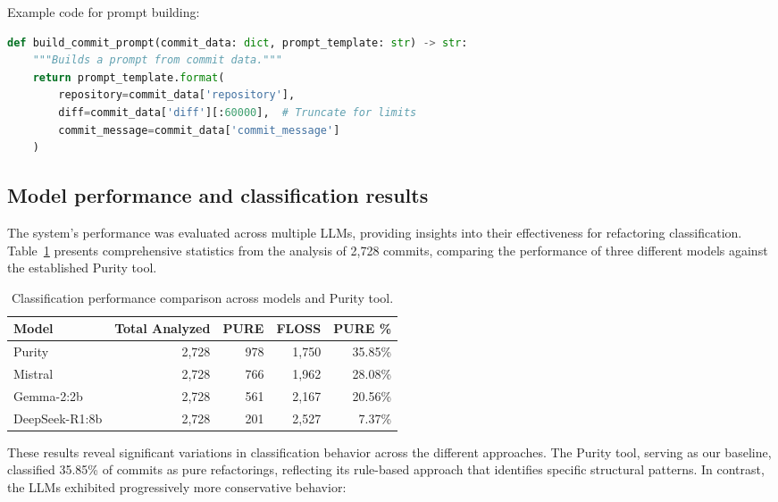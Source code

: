 



Example code for prompt building:

\begin{lstlisting}[language=Python]
def build_commit_prompt(commit_data: dict, prompt_template: str) -> str:
    """Builds a prompt from commit data."""
    return prompt_template.format(
        repository=commit_data['repository'],
        diff=commit_data['diff'][:60000],  # Truncate for limits
        commit_message=commit_data['commit_message']
    )
\end{lstlisting}



\subsection{Model performance and classification results}
The system's performance was evaluated across multiple LLMs, providing insights into their effectiveness for refactoring classification. Table~\ref{tab:model-performance-rotated} presents comprehensive statistics from the analysis of 2,728 commits, comparing the performance of three different models against the established Purity tool.

\begin{table}[H]
\centering
\caption{Classification performance comparison across models and Purity tool.}
\label{tab:model-performance-rotated}
\begin{tabular}{@{}lrrrr@{}}
\toprule
\textbf{Model} & \textbf{Total Analyzed} & \textbf{PURE} & \textbf{FLOSS} & \textbf{PURE \%} \\
\midrule
Purity & 2,728 & 978 & 1,750 & 35.85\% \\
Mistral & 2,728 & 766 & 1,962 & 28.08\% \\
Gemma-2:2b & 2,728 & 561 & 2,167 & 20.56\% \\
DeepSeek-R1:8b & 2,728 & 201 & 2,527 & 7.37\% \\
\bottomrule
\end{tabular}
\end{table}

These results reveal significant variations in classification behavior across the different approaches. The Purity tool, serving as our baseline, classified 35.85\% of commits as pure refactorings, reflecting its rule-based approach that identifies specific structural patterns. In contrast, the LLMs exhibited progressively more conservative behavior:

